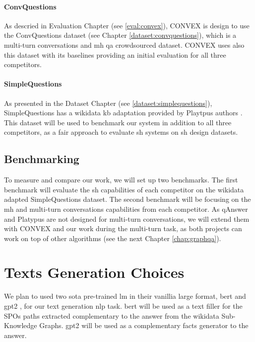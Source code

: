 \paragraph{ConvQuestions}
As descried in Evaluation Chapter (see \ref{eval:convex}), CONVEX \autocite{paper:convex} is design to use the ConvQuestions dataset (see Chapter \ref{dataset:convquestions}), which is a multi-turn conversations and \gls{mh} \gls{qa} crowdsourced dataset. CONVEX uses also this dataset with its baselines providing an initial evaluation for all three competitors.

\paragraph{SimpleQuestions}
As presented in the Dataset Chapter (see \ref{dataset:simplequestions}), SimpleQuestions has a \gls{wikidata} \gls{kb} adaptation provided by Playtpus authors \autocite{paper:InProceedingsPellissier-Tanon.P-TD-d-ACM-S_18}. This dataset will be used to benchmark our system in addition to all three competitors, as a fair approach to evaluate \gls{sh} systems on \gls{sh} design datasets.

\subsection{Benchmarking}
\label{analysis:benchmarking}
To measure and compare our work, we will set up two benchmarks. The first benchmark will evaluate the \gls{sh} capabilities of each competitor on the \gls{wikidata} adapted SimpleQuestions dataset. The second benchmark will be focusing on the \gls{mh} and multi-turn conversations capabilities from each competitor. As qAnswer and Platypus are not designed for multi-turn conversations, we will extend them with CONVEX and our work during the multi-turn task, as both projects can work on top of other algorithms (see the next Chapter \ref{chap:graphqa}).



\section{Texts Generation Choices}
We plan to used two \gls{sota} pre-trained \gls{lm} in their vanillia large format, \gls{bert} \autocite{paper:devlin-etal-2019-bert} and \gls{gpt2} \autocite{papers:gpt2}, for our text generation \gls{nlp} task. \gls{bert} will be used as a text filler for the SPOs paths extracted complementary to the answer from the \gls{wikidata} Sub-Knowledge Graphs. \gls{gpt2} will be used as a complementary facts generator to the answer.

